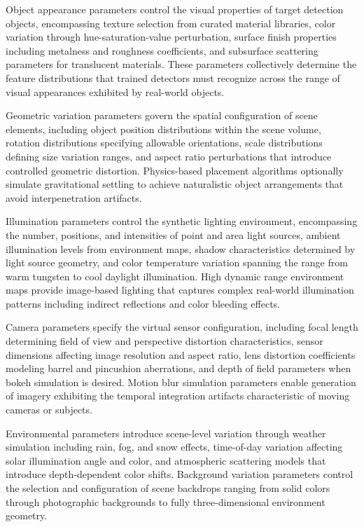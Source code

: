 Object appearance parameters control the visual properties of target detection objects, encompassing texture selection from curated material libraries, color variation through hue-saturation-value perturbation, surface finish properties including metalness and roughness coefficients, and subsurface scattering parameters for translucent materials. These parameters collectively determine the feature distributions that trained detectors must recognize across the range of visual appearances exhibited by real-world objects.

Geometric variation parameters govern the spatial configuration of scene elements, including object position distributions within the scene volume, rotation distributions specifying allowable orientations, scale distributions defining size variation ranges, and aspect ratio perturbations that introduce controlled geometric distortion. Physics-based placement algorithms optionally simulate gravitational settling to achieve naturalistic object arrangements that avoid interpenetration artifacts.

Illumination parameters control the synthetic lighting environment, encompassing the number, positions, and intensities of point and area light sources, ambient illumination levels from environment maps, shadow characteristics determined by light source geometry, and color temperature variation spanning the range from warm tungsten to cool daylight illumination. High dynamic range environment maps provide image-based lighting that captures complex real-world illumination patterns including indirect reflections and color bleeding effects.

Camera parameters specify the virtual sensor configuration, including focal length determining field of view and perspective distortion characteristics, sensor dimensions affecting image resolution and aspect ratio, lens distortion coefficients modeling barrel and pincushion aberrations, and depth of field parameters when bokeh simulation is desired. Motion blur simulation parameters enable generation of imagery exhibiting the temporal integration artifacts characteristic of moving cameras or subjects.

Environmental parameters introduce scene-level variation through weather simulation including rain, fog, and snow effects, time-of-day variation affecting solar illumination angle and color, and atmospheric scattering models that introduce depth-dependent color shifts. Background variation parameters control the selection and configuration of scene backdrops ranging from solid colors through photographic backgrounds to fully three-dimensional environment geometry.

